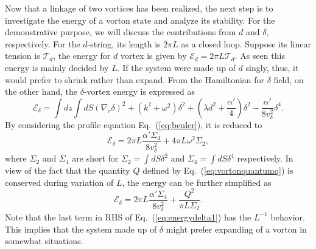 Now that a linkage of two vortices has been realized, the next step is to investigate the energy of a vorton state
and analyze its stability. For the demonstrative purpose, we will discuss the contributions from $d$ and
$\delta$, respectively. For the $d$-string, its length is $2 \pi L$ as a closed loop.
Suppose its linear tension is $\mathcal{T}_d$, the energy for $d$ vortex is given by
$\mathcal{E}_d = 2\pi L \mathcal{T}_d$. As seen this energy is mainly decided by $L$. 
If the system were made up of $d$ singly, thus, it would prefer to shrink
rather than expand.
From the Hamiltonian for $\delta$ field, on the other hand, the $\delta$-vortex energy is expressed as 
\begin{equation}
  \label{eq:deltah}
  \mathcal{E}_\delta = \int dz \int dS  (\nabla_r \delta)^2 + (k^2 + \omega^2)\delta^2 + (\lambda d^2 + \frac{\alpha'}{4})\delta^2 - \frac{\alpha'}{8v_\delta^2}\delta^4.
\end{equation}
By considering the profile equation Eq.~(\ref{eq:beuler}), it is reduced to
\begin{equation}
  \label{eq:energydelta}
  \mathcal{E}_{\delta} =  2\pi L\frac{\alpha' \Sigma_4}{8v_\delta^2} + 4 \pi L \omega^2 \Sigma_2,
\end{equation}
where $\Sigma_2$ and $\Sigma_4$ are short for
$\Sigma_2 = \int dS \delta^2$ and $\Sigma_4 = \int dS \delta^4$ respectively.
In view of the fact that the quantity $Q$ defined by Eq.~(\ref{eq:vortonquantumq}) is
conserved during variation of $L$, the energy can be further simplified as
\begin{equation}
  \label{eq:energydelta1}
  \mathcal{E}_{\delta} =  2\pi L\frac{\alpha' \Sigma_4}{8v_\delta^2} + \frac{Q^2}{\pi L \Sigma_2}.
\end{equation}
Note that the last term in RHS of Eq.~(\ref{eq:energydelta1}) has the
$L^{-1}$ behavior. 
This implies that the system made up of $\delta$ might prefer expanding of a vorton in somewhat situations.
%

